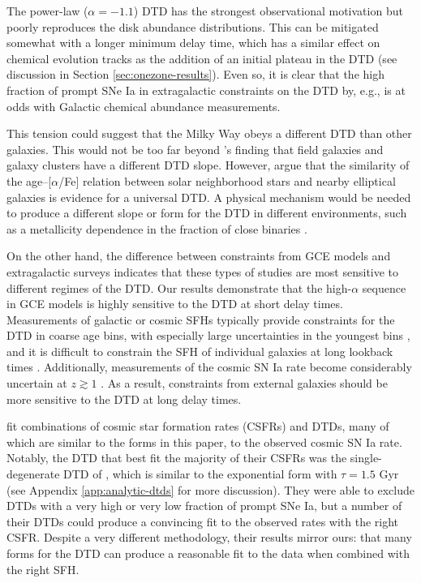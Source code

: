 \documentclass[twocolumn,twocolappendix,linenumbers]{aastex631}
\newcommand{\aFe}{[$\alpha$/Fe]\xspace}
\begin{document}
The power-law ($\alpha=-1.1$) DTD has the strongest observational motivation but poorly reproduces the disk abundance distributions. This can be mitigated somewhat with a longer minimum delay time, which has a similar effect on chemical evolution tracks as the addition of an initial plateau in the DTD (see discussion in Section \ref{sec:onezone-results}). Even so, it is clear that the high fraction of prompt SNe Ia in extragalactic constraints on the DTD by, e.g., \citet{Maoz2017-CosmicDTD} is at odds with Galactic chemical abundance measurements. 

This tension could suggest that the Milky Way obeys a different DTD than other galaxies. This would not be too far beyond \citeauthor{Maoz2017-CosmicDTD}'s \citeyearpar{Maoz2017-CosmicDTD} finding that field galaxies and galaxy clusters have a different DTD slope. However, \citet{Walcher2016-SelfSimilarity} argue that the similarity of the age--\aFe relation between solar neighborhood stars and nearby elliptical galaxies is evidence for a universal DTD. A physical mechanism would be needed to produce a different slope or form for the DTD in different environments, such as a metallicity dependence in the fraction of close binaries \citep[e.g.,][]{Moe2019-CloseBinaryFraction}.

On the other hand, the difference between constraints from GCE models and extragalactic surveys indicates that these types of studies are most sensitive to different regimes of the DTD. Our results demonstrate that the high-$\alpha$ sequence in GCE models is highly sensitive to the DTD at short delay times. Measurements of galactic or cosmic SFHs typically provide constraints for the DTD in coarse age bins, with especially large uncertainties in the youngest bins \citep[e.g.,][]{MaozMannucci2012-SNeIaReview}, and it is difficult to constrain the SFH of individual galaxies at long lookback times \citep{Conroy2013-PanchromaticSED}. Additionally, measurements of the cosmic SN Ia rate become considerably uncertain at $z\gtrsim1$ \citep[see, e.g.,][]{Palicio2024-CosmicSNIaRate}. As a result, constraints from external galaxies should be more sensitive to the DTD at long delay times.

\citet{Palicio2024-CosmicSNIaRate} fit combinations of cosmic star formation rates (CSFRs) and DTDs, many of which are similar to the forms in this paper, to the observed cosmic SN Ia rate. Notably, the DTD that best fit the majority of their CSFRs was the single-degenerate DTD of \citet{MatteucciRecchi2001-SNIaTimescale}, which is similar to the exponential form with $\tau=1.5$ Gyr (see Appendix \ref{app:analytic-dtds} for more discussion). They were able to exclude DTDs with a very high or very low fraction of prompt SNe Ia, but a number of their DTDs could produce a convincing fit to the observed rates with the right CSFR. Despite a very different methodology, their results mirror ours: that many forms for the DTD can produce a reasonable fit to the data when combined with the right SFH. 
\end{document}
